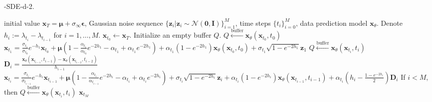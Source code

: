 \begin{algorithm}[H]
    \centering
    \caption{\ourmethod-SDE-d-2.}\label{alg:sde-d-2}
    \begin{algorithmic}[1]
    \REQUIRE initial value $\boldsymbol{x}_T=\boldsymbol\mu+\sigma_\infty\boldsymbol\epsilon$, Gaussian noise sequence $\{\boldsymbol{z}_i|\boldsymbol{z}_i\sim\mathcal{N}(\boldsymbol{0}, \boldsymbol{I})\}_{i=1}^M$, time steps $\{t_i\}_{i=0}^M$, data prediction model $\boldsymbol{x}_\theta$. Denote $h_i:=\lambda_{t_i}-\lambda_{t_{i-1}}$ for $i=1,\ldots,M$.
        \STATE $\boldsymbol{x}_{t_0}\leftarrow\boldsymbol{x}_T$. Initialize an empty buffer $Q$.
        \STATE $Q\xleftarrow{\text{buffer}}\boldsymbol{x}_\theta(\boldsymbol{x}_{t_0},t_0)$
        \STATE $\boldsymbol{x}_{t_1}=\frac{\sigma_{t_1}}{\sigma_{t_{0}}}e^{-h_1}\boldsymbol{x}_{t_{0}}
        +\boldsymbol\mu\left(1-\frac{\alpha_{t_1}}{\alpha_{t_{0}}}e^{-2h_1}-\alpha_{t_1}+\alpha_{t_1}e^{-2h_1}\right)
        +\alpha_{t_1}\left(1-e^{-2h_1}\right)\boldsymbol{x}_\theta(\boldsymbol{x}_{t_{0}},t_{0})
        +\sigma_{t_1}\sqrt{1-e^{-2h_1}}\boldsymbol{z}_1$
        \STATE $Q \xleftarrow{\text{buffer}} \boldsymbol{x}_\theta(\boldsymbol{x}_{t_i}, t_i)$
        \STATE $\boldsymbol{D}_i=\frac{\boldsymbol x_\theta(\boldsymbol{x}_{t_{i-1}},t_{i-1})-\boldsymbol x_\theta(\boldsymbol{x}_{t_{i-2}},t_{i-2})}{h_{i-1}}$
        \STATE $\boldsymbol{x}_{t_i}=\frac{\sigma_{t_i}}{\sigma_{t_{i-1}}}e^{-h_i}\boldsymbol{x}_{t_{i-1}}
        +\boldsymbol\mu\left(1-\frac{\alpha_{t_i}}{\alpha_{t_{i-1}}}e^{-2h_i}-\alpha_{t_i}+\alpha_{t_i}e^{-2h_i}\right)+\sigma_{t_i}\sqrt{1-e^{-2h_i}}\boldsymbol{z}_i
        +\alpha_{t_i}\left(1-e^{-2h_i}\right)\boldsymbol{x}_\theta(\boldsymbol{x}_{t_{i-1}},t_{i-1})
        +\alpha_{t_i}\left(h_i-\frac{1-e^{-2h_i}}{2}\right)\boldsymbol{D}_i$
        \STATE If $i < M$, then $Q \xleftarrow{\text{buffer}} \boldsymbol{x}_\theta(\boldsymbol{x}_{t_i}, t_i)$
        \ENDFOR
        \RETURN $\boldsymbol{x}_{t_M}$
    \end{algorithmic}
\end{algorithm}

